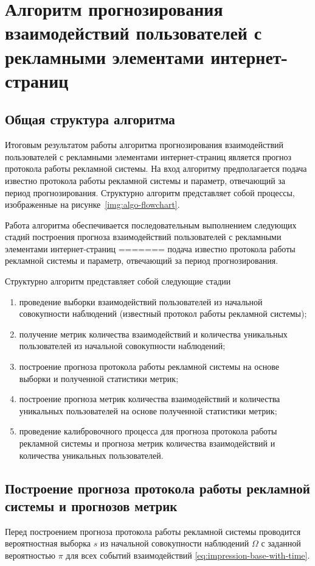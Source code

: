\section{Алгоритм прогнозирования взаимодействий пользователей с рекламными элементами интернет-страниц}
\subsection{Общая структура алгоритма}
Итоговым результатом работы алгоритма прогнозирования взаимодействий пользователей с рекламными элементами
интернет-страниц является прогноз протокола работы рекламной системы. На вход алгоритму предполагается
подача известно протокола работы рекламной системы и параметр, отвечающий за период прогнозирования. 
Структурно алгоритм представляет собой процессы, изображенные на рисунке~\ref{img:algo-flowchart}.


Работа алгоритма обеспечивается последовательным выполнением следующих стадий построения прогноза взаимодействий 
пользователей с рекламными элементами интернет-страниц
=======
подача известно протокола работы рекламной системы и параметр, отвечающий за период прогнозирования.

Структурно алгоритм представляет собой следующие стадии
\begin{enumerate}
    \item проведение выборки взаимодействий пользователей из начальной совокупности наблюдений (известный протокол
    работы рекламной системы);
    \item получение метрик количества взаимодействий и количества уникальных пользователей из начальной совокупности 
    наблюдений;
    \item построение прогноза протокола работы рекламной системы на основе выборки и полученной статистики метрик;
    \item построение прогноза метрик количества взаимодействий и количества уникальных пользователей на основе 
    полученной статистики метрик;
    \item проведение калибровочного процесса для прогноза протокола работы рекламной системы и прогноза метрик количества
    взаимодействий и количества уникальных пользователей.
\end{enumerate}

\subsection{Построение прогноза протокола работы рекламной системы и прогнозов метрик}
Перед построением прогноза протокола работы рекламной системы проводится вероятностная выборка $s$ из начальной совокупности 
наблюдений $\Omega$ с заданной вероятностью $\pi$ для всех событий взаимодействий \eqref{eq:impression-base-with-time}.


